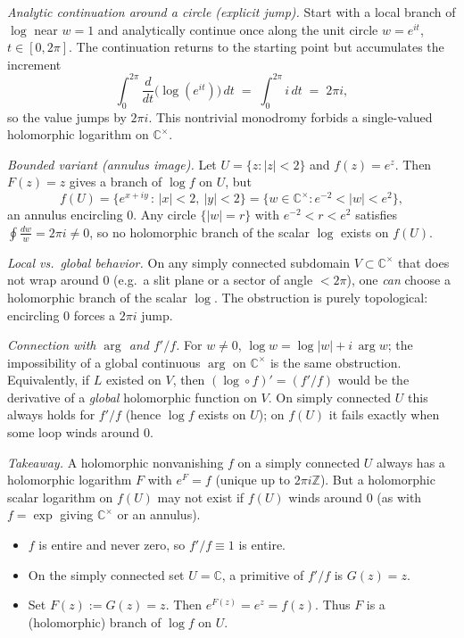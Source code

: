 \documentclass[11pt]{article}
\begin{document}
\medskip

\emph{Analytic continuation around a circle (explicit jump).}
Start with a local branch of $\log$ near $w=1$ and analytically continue once along the unit circle $w=e^{it}$, $t\in[0,2\pi]$.
The continuation returns to the starting point but accumulates the increment
\[
\int_{0}^{2\pi}\frac{d}{dt}\big(\log(e^{it})\big)\,dt
\;=\;\int_{0}^{2\pi} i\,dt
\;=\;2\pi i,
\]
so the value jumps by $2\pi i$. This nontrivial monodromy forbids a single-valued holomorphic logarithm on $\mathbb{C}^\times$.

\medskip

\emph{Bounded variant (annulus image).}
Let $U=\{z:|z|<2\}$ and $f(z)=e^{z}$. Then $F(z)=z$ gives a branch of $\log f$ on $U$, but
\[
f(U)=\{e^{x+iy}\,:\,|x|<2,\ |y|<2\}
=\{w\in\mathbb{C}^\times: e^{-2}<|w|<e^{2}\},
\]
an annulus encircling $0$. Any circle $\{|w|=r\}$ with $e^{-2}<r<e^{2}$ satisfies $\displaystyle\oint\frac{dw}{w}=2\pi i\neq 0$, so no holomorphic branch of the scalar $\log$ exists on $f(U)$.

\medskip

\emph{Local vs.\ global behavior.}
On any simply connected subdomain $V\subset\mathbb{C}^\times$ that does not wrap around $0$ (e.g.\ a slit plane or a sector of angle $<2\pi$), one \emph{can} choose a holomorphic branch of the scalar $\log$.
The obstruction is purely topological: encircling $0$ forces a $2\pi i$ jump.

\medskip

\emph{Connection with $\arg$ and $f'/f$.}
For $w\neq 0$, $\log w=\log|w|+i\,\arg w$; the impossibility of a global continuous $\arg$ on $\mathbb{C}^\times$ is the same obstruction.
Equivalently, if $L$ existed on $V$, then $(\log\circ f)'=(f'/f)$ would be the derivative of a \emph{global} holomorphic function on $V$.
On simply connected $U$ this always holds for $f'/f$ (hence $\log f$ exists on $U$); on $f(U)$ it fails exactly when some loop winds around $0$.

\medskip

\emph{Takeaway.}
A holomorphic nonvanishing $f$ on a simply connected $U$ always has a holomorphic logarithm $F$ with $e^{F}=f$ (unique up to $2\pi i\mathbb{Z}$).
But a holomorphic scalar logarithm on $f(U)$ may not exist if $f(U)$ winds around $0$ (as with $f=\exp$ giving $\mathbb{C}^\times$ or an annulus).

\begin{itemize}
\item $f$ is entire and never zero, so $f'/f \equiv 1$ is entire.
\item On the simply connected set $U=\mathbb{C}$, a primitive of $f'/f$ is $G(z)=z$.
\item Set $F(z):=G(z)=z$. Then $e^{F(z)}=e^{z}=f(z)$.
Thus $F$ is a (holomorphic) branch of $\log f$ on $U$.
\end{itemize}
\end{document}
